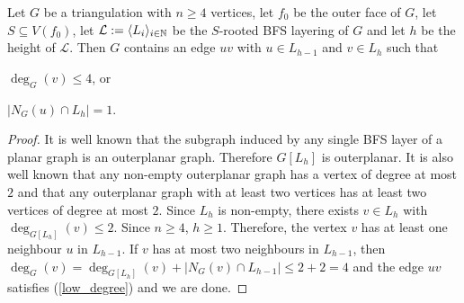 \documentclass{patmorin}
\begin{document}
\begin{lem}\label{good_edge}
  Let $G$ be a triangulation with $n\ge 4$ vertices, let $f_0$ be the outer face of $G$, let $S\subseteq V(f_0)$, let $\mathcal{L}:=\langle L_i\rangle_{i\in\mathbb{N}}$ be the $S$-rooted BFS layering of $G$ and let $h$ be the height of $\mathcal{L}$.
  Then $G$ contains an edge $uv$ with $u\in L_{h-1}$ and $v\in L_{h}$ such that
  \begin{compactenum}[(a)]
    \item $\deg_G(v)\le 4$, or\label{low_degree}
    \item $|N_G(u)\cap L_h|=1$.\label{only_child}
  \end{compactenum}
\end{lem}

\begin{proof}
  It is well known that the subgraph induced by any single BFS layer of a planar graph is an outerplanar graph.  Therefore $G[L_h]$ is outerplanar.  It is also well known that any non-empty outerplanar graph has a vertex of degree at most $2$ and that any outerplanar graph with at least two vertices has at least two vertices of degree at most $2$.  Since $L_h$ is non-empty, there exists $v\in L_h$ with  $\deg_{G[L_h]}(v)\le 2$.  Since $n\ge 4$, $h\ge 1$.  Therefore, the vertex $v$ has at least one neighbour $u$ in $L_{h-1}$.  If $v$ has at most two neighbours in $L_{h-1}$, then $\deg_G(v)=\deg_{G[L_h]}(v)+|N_G(v)\cap L_{h-1}|\le 2+2=4$ and the edge $uv$ satisfies (\ref{low_degree}) and we are done.


\end{proof}
\end{document}
